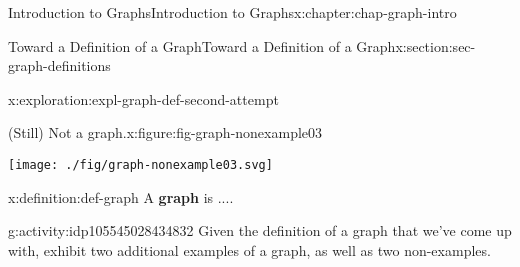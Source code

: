 \documentclass[oneside,10pt,]{book}
\newcommand{\terminology}[1]{\textbf{#1}}
\begin{document}
\begin{chapterptx}{Introduction to Graphs}{}{Introduction to Graphs}{}{}{x:chapter:chap-graph-intro}
\begin{sectionptx}{Toward a Definition of a Graph}{}{Toward a Definition of a Graph}{}{}{x:section:sec-graph-definitions}
\begin{exploration}{}{x:exploration:expl-graph-def-second-attempt}
\begin{figureptx}{(Still) Not a graph.}{x:figure:fig-graph-nonexample03}{}
\begin{image}{0.375}{0.25}{0.375}%
\texttt{[image: ./fig/graph-nonexample03.svg]}
\end{image}%
\tcblower
\end{figureptx}%
\end{exploration}%
\begin{definition}{}{x:definition:def-graph}%
%
A \terminology{graph} is ....%
\end{definition}
\begin{activity}{}{g:activity:idp105545028434832}%
Given the definition of a graph that we've come up with, exhibit two additional examples of a graph, as well as two non-examples.%
\end{activity}%
\end{sectionptx}
\end{chapterptx}
%
%
\typeout{************************************************}
\typeout{************************************************}
%
\end{document}
